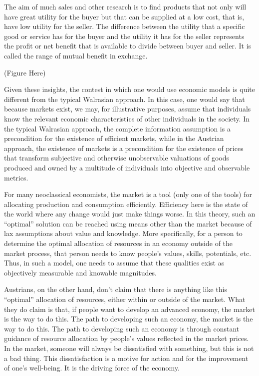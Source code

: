 The aim of much sales and other research is to find products that not only will have great utility for the buyer but that can be supplied at a low cost, that is, have low utility for the seller. The difference between the utility that a specific good or service has for the buyer and the utility it has for the seller represents the profit or net benefit that is available to divide between buyer and seller. It is called the range of mutual benefit in exchange.

(Figure Here)

Given these insights, the contest in which one would use economic models is quite different from the typical Walrasian approach. In this case, one would say that because markets exist, we may, for illustrative purposes, assume that individuals know the relevant economic characteristics of other individuals in the society. In the typical Walrasian approach, the complete information assumption is a precondition for the existence of efficient markets, while in the Austrian approach, the existence of markets is a precondition for the existence of prices that transform subjective and otherwise unobservable valuations of goods produced and owned by a multitude of individuals into objective and observable metrics.

For many neoclassical economists, the market is a tool (only one of the tools) for allocating production and consumption efficiently. Efficiency here is the state of the world where any change would just make things worse. In this theory, such an “optimal” solution can be reached using means other than the market because of lax assumptions about value and knowledge. More specifically, for a person to determine the optimal allocation of resources in an economy outside of the market process, that person needs to know people’s values, skills, potentials, etc. Thus, in such a model, one needs to assume that these qualities exist as objectively measurable and knowable magnitudes.

Austrians, on the other hand, don’t claim that there is anything like this “optimal” allocation of resources, either within or outside of the market. What they do claim is that, if people want to develop an advanced economy, the market is the way to do this. The path to developing such an economy, the market is the way to do this. The path to developing such an economy is through constant guidance of resource allocation by people’s values reflected in the market prices. In the market, someone will always be dissatisfied with something, but this is not a bad thing. This dissatisfaction is a motive for action and for the improvement of one’s well-being. It is the driving force of the economy.

